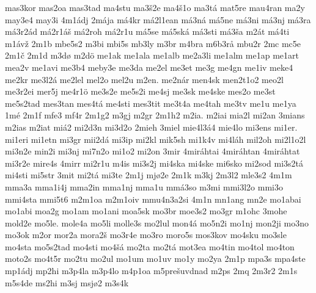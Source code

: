 {    mas3kor
    mas2oa
    mas3tad
    ma4stu
    ma3š2e
    ma4š1o
    ma3tá
    mat5re
    mau4ran
    ma2y
    may3e4
    may3i
    4m1ádj
    2mája
    má4kr
    má2l1ean
    má3ná
    má5ne
    má3ni
    má3nj
    má3ra
    má3r2ád
    má2r1áš
    má2roh
    má2r1u
    má5se
    má5ská
    má3sti
    má3ša
    m2át
    má4ti
    m1ávž
    2m1b
    mbe5s2
    m3bi
    mbi5s
    mb3ly
    m3br
    m4bra
    m6b3rå
    mbu2r
    2mc
    mc5e
    2m1č
    2m1d
    m3dø
    m2dö
    me1ak
    me1ala
    me1alb
    me2a3li
    me1alm
    me1ap
    me1art
    mea2v
    me1avi
    me3b4
    meby3e
    me3da
    me2el
    me3et
    me3g
    me4gn
    me1iv
    meke4
    me2kr
    me3l2á
    me2lel
    mel2o
    mel2u
    m2en.
    me2nár
    men4sk
    men2t1o2
    meo2l
    me3r2ei
    mer5j
    me4r1ö
    me3s2e
    me5s2i
    me4sj
    me3sk
    me4ske
    mes2o
    me3st
    me5s2tad
    mes3tan
    mes4tá
    me4sti
    mes3tit
    me3t4a
    me4tah
    me3tv
    me1u
    me1ya
    1mé
    2m1f
    mfe3
    mf4r
    2m1g2
    m3gj
    m2gr
    2m1h2
    m2ia.
    m2iai
    mia2l
    mi2an
    3mians
    m2ias
    m2iat
    miá2
    mi2d3n
    mi3d2o
    2mieh
    3miel
    mie4l3á4
    mie4lo
    mi3ens
    mi1er.
    mi1eri
    mi1etn
    mi3gr
    mii2dá
    mi3ip
    mi2kl
    mik5sh
    mi1k4v
    mi4láh
    mil2oh
    mi2l1o2l
    mi3n2e
    min2i
    mi3nj
    mi7n2o
    mi1o2
    mi2on
    3mir
    4miráhtai
    4miráhtan
    4miráhtat
    mi3r2e
    mire4s
    4mirr
    mi2r1u
    m4is
    mi3s2j
    mi4ska
    mi4ske
    mi6sko
    mi2sod
    mi3s2tá
    mi4sti
    mi5str
    3mit
    mi2tá
    mi3te
    2m1j
    mjø2e
    2m1k
    m3kj
    2m3l2
    mle3s2
    4m1m
    mma3a
    mma1i4j
    mma2in
    mma1nj
    mma1u
    mmá3so
    m3mi
    mmi3l2o
    mmi3o
    mmi4sta
    mmi5t6
    m2m1oa
    m2m1oiv
    mmu4n3a2si
    4m1n
    mn1ang
    mn2e
    mo1abai
    mo1abi
    moa2g
    mo1am
    mo1ani
    moa5sk
    mo3br
    moe3s2
    mo3gr
    m1ohc
    3mohe
    mold2e
    mo5le.
    mole4a
    mo5li
    molle3s
    mo2lul
    mon4á
    mo5n2i
    mo1nj
    mon2ji
    mo3no
    mo3ok
    m2or
    mor2a
    mora2š
    mo3r4e
    mo3ro
    moro5s
    mos3kov
    mo4sku
    mo3sle
    mo4sta
    mo5s2tad
    mo4sti
    mo4šá
    mo2ta
    mo2tá
    mot3ea
    mo4tin
    mo4tol
    mo4ton
    moto2s
    mo4t5r
    mo2tu
    mo2ul
    mo1um
    mo1uv
    mo1y
    mo2ya
    2m1p
    mpa3s
    mpa4ste
    mp1ádj
    mp2hi
    m3p4la
    m3p4lo
    m4p1oa
    m5prešuvdnad
    m2ps
    2mq
    2m3r2
    2m1s
    m5s4de
    ms2hi
    m3sj
    msjø2
    m3s4k
}
